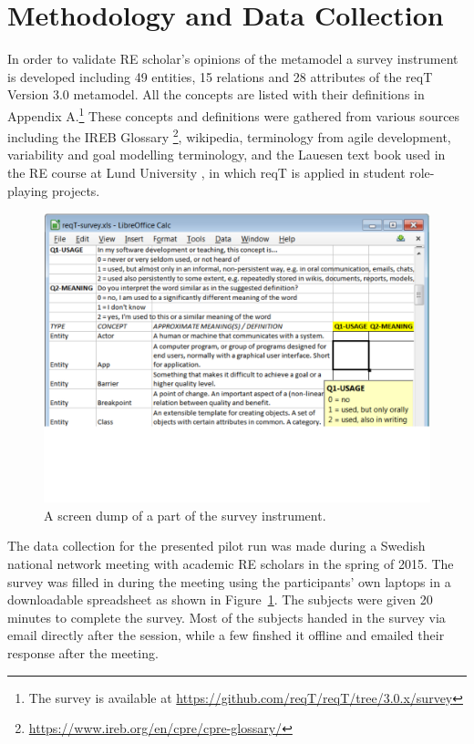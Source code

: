 \documentclass[a4paper]{llncs}
\begin{document}
\section{Methodology and Data Collection}
In order to validate RE scholar's opinions of the metamodel a survey instrument is developed including 49 entities, 15 relations and 28 attributes of the reqT Version 3.0 metamodel. All the concepts are listed with their definitions in Appendix A.\footnote{The survey is available at \url{https://github.com/reqT/reqT/tree/3.0.x/survey}} These concepts and definitions were gathered from various sources including the IREB Glossary \footnote{\url{https://www.ireb.org/en/cpre/cpre-glossary/}}, wikipedia, terminology from agile development, variability \cite{metzger2007variability} and goal modelling terminology, and the Lauesen text book \cite{Lauesen2002} used in the RE course at Lund University \cite{ets170}, in which reqT is applied in student role-playing projects. 
\begin{figure}[h]
\centering
\includegraphics[width=\textwidth]{img/survey-screen-dump}
\caption{A screen dump of a part of the survey instrument.}
\label{fig:survey}
\end{figure}

\noindent The data collection for the presented pilot run was made during a Swedish national network meeting with academic RE scholars in the spring of 2015. The survey was filled in during the meeting using the participants' own laptops  in a downloadable spreadsheet as shown in Figure~\ref{fig:survey}. The subjects were given 20 minutes to complete the survey. Most of the subjects handed in the survey via email directly after the session, while a few finshed it offline and emailed their response after the meeting. 
\end{document}
